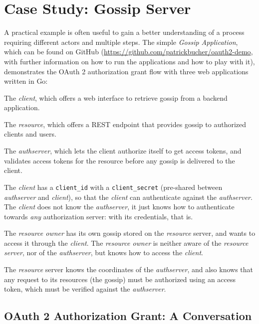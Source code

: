 \section{Case Study: Gossip Server}

A practical example is often useful to gain a better understanding of a process requiring different actors and multiple steps. The simple \textit{Gossip Application}, which can be found on GitHub (\url{https://github.com/patrickbucher/oauth2-demo}, with further information on how to run the applications and how to play with it), demonstrates the OAuth 2 authorization grant flow with three web applications written in Go:

\begin{description}
    \item The \textit{client}, which offers a web interface to retrieve gossip from a backend application. 
    \item The \textit{resource}, which offers a REST endpoint that provides gossip to authorized clients and users.
    \item The \textit{authserver}, which lets the client authorize itself to get access tokens, and validates access tokens for the resource before any gossip is delivered to the client.
\end{description}

The \textit{client} has a \texttt{client\_id} with a \texttt{client\_secret} (pre-shared between \textit{authserver} and \textit{client}), so that the \textit{client} can authenticate against the \textit{authserver}. The \textit{client} does not know the \textit{authserver}, it just knows how to authenticate towards \textit{any} authorization server: with its credentials, that is.

The \textit{resource owner} has its own gossip stored on the \textit{resource} server, and wants to access it through the \textit{client}. The \textit{resource owner} is neither aware of the \textit{resource server}, nor of the \textit{authserver}, but knows how to access the \textit{client}.

The \textit{resource} server knows the coordinates of the \textit{authserver}, and also knows that any request to its resources (the gossip) must be authorized using an access token, which must be verified against the \textit{authserver}.

\subsection{OAuth 2 Authorization Grant: A Conversation}

